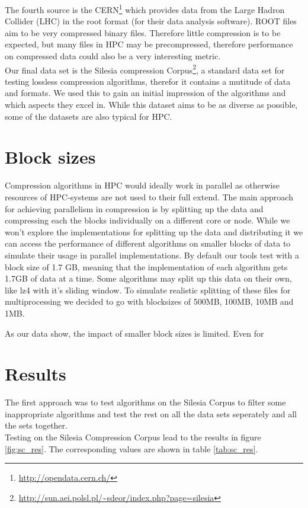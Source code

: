 \documentclass[
	12pt,
	a4paper,
	BCOR10mm,
	DIV14,
	listof=totoc,
	bibliography=totoc,
	headsepline
]{scrreprt}
\begin{document}
The fourth source is the CERN\footnote{\url{http://opendata.cern.ch/}} which provides data from the Large Hadron Collider (LHC) in the root format (for their data analysis software).
ROOT files aim to be very compressed binary files. Therefore little compression is to be expected, but many files in HPC may be precompressed, therefore performance on compressed data could also be a very interesting metric.
\\

Our final data set is the Silesia compression Corpus\footnote{\url{http://sun.aei.polsl.pl/~sdeor/index.php?page=silesia}}, a standard data set for testing lossless compression algorithms, therefor it contains a mutitude of data and formats. We used this to gain an initial impression of the algorithms and which aspects they excel in. While this dataset aims to be as diverse as possible, some of the datasets are also typical for HPC.
\\

\newpage
\section*{Block sizes}
Compression algorithms in HPC would ideally work in parallel as otherwise resources of HPC-systems are not used to their full extend.
The main approach for achieving parallelism in compression is by splitting up the data and compressing each the blocks individually on a different core or node.
While we won't explore the implementations for splitting up the data and distributing it we can access the performance of different algorithms on smaller blocks of data to simulate their usage in parallel implementations.
By default our tools test with a block size of 1.7 GB, meaning that the implementation of each algorithm gets 1.7GB of data at a time. 
Some algorithms may split up this data on their own, like lz4 with it's sliding window. %
To simulate realistic splitting of these files for multiprocessing we decided to go with blocksizes of 500MB, 100MB, 10MB and 1MB.


As our data show, the impact of smaller block sizes is limited. Even for %


\section{Results}
The first approach was to test algorithms on the Silesia Corpus to filter some inappropriate algorithms and test the rest on all the data sets seperately and all the sets together.
\\
Testing on the Silesia Compression Corpus lead to the results in figure \ref{fig:sc_res}. 
The corresponding values are shown in table \ref{tab:sc_res}. \\
\end{document}
